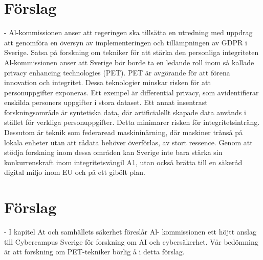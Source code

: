 {{\section*{Förslag}
- Al-kommissionen anser att regeringen ska tillsätta en utredning med uppdrag att genomföra en översyn av implementeringen och tillämpningen av GDPR i Sverige.
Satsa på forskning om tekniker för att stärka den personliga integriteten
Al-kommissionen anser att Sverige bör borde ta en ledande roll inom så kallade privacy enhancing technologies (PET). PET är avgörande för att förena innovation och integritet. Dessa teknologier minskar risken för att personuppgifter exponeras. Ett exempel är differential privacy, som avidentifierar enskilda personers uppgifter i stora dataset. Ett annat insentrast forskningsområde är syntetiska data, där artificialellt skapade data används i stället för verkliga personuppgifter. Detta minimarer risken för integritetsinträng. Dessutom är teknik som federaread maskininärning, där maskiner trånså på lokala enheter utan att rådata behöver överförlas, av stort ressence. Genom att stödja forskning inom dessa områden kan Sverige inte bara stärka sin konkurrenskraft inom integritetsvängil A1, utan också brätta till en säkeråd digital miljo inom EU och på ett gibölt plan.
\section*{Förslag}
- I kapitel At och samhällets säkerhet föreslår Al-
kommissionen ett höjtt anslag till Cybercampus Sverige för forskning om AI och cybersäkerhet. Vår bedömning är att forskning om PET-tekniker börlig å i detta förslag.
}}
